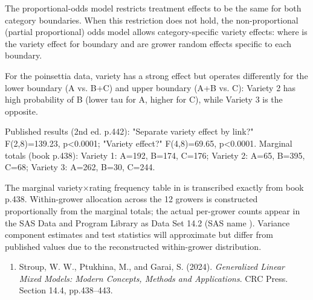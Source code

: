 \documentclass[a4paper]{book}
\begin{document}
\begin{Details}
The proportional-odds model restricts treatment effects  to be
the same for both category boundaries.  When this restriction does not hold,
the non-proportional (partial proportional) odds model allows
category-specific variety effects:
where  is the variety effect for boundary  and
 are grower random effects specific to each boundary.

For the poinsettia data, variety has a strong effect but operates differently
for the lower boundary (A vs. B+C) and upper boundary (A+B vs. C):
Variety 2 has high probability of B (lower tau for A, higher for C), while
Variety 3 is the opposite.

Published results (2nd ed. p.442):
"Separate variety effect by link?" F(2,8)=139.23, p<0.0001;
"Variety effect?" F(4,8)=69.65, p<0.0001.
Marginal totals (book p.438): Variety 1: A=192, B=174, C=176;
Variety 2: A=65, B=395, C=68; Variety 3: A=262, B=30, C=244.
\end{Details}
%
\begin{Note}
 The marginal variety×rating frequency table in
 is transcribed exactly from book p.438.  Within-grower
allocation across the 12 growers is constructed proportionally from the
marginal totals; the actual per-grower counts appear in the SAS Data and
Program Library as Data Set 14.2 (SAS name ).
Variance component estimates and test statistics will approximate but
differ from published values due to the reconstructed within-grower
distribution.
\end{Note}
%
\begin{References}
\begin{enumerate}

\item{} Stroup, W. W., Ptukhina, M., and Garai, S. (2024).
\emph{Generalized Linear Mixed Models: Modern Concepts, Methods and
Applications}. CRC Press. Section 14.4, pp.438–443.

\end{enumerate}

\end{References}
%
\begin{SeeAlso}
\end{SeeAlso}
%
\end{document}
